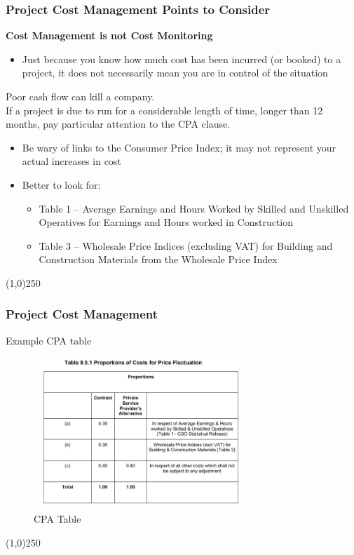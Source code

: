 \begin{frame}
\frametitle{Project Cost Management \hfill Points to Consider}
\textbf{Cost Management is not Cost Monitoring}
\begin{itemize}
	\item Just because you know how much cost has been incurred (or booked) to a project, it does not necessarily mean you are in control of the situation
\end{itemize}
Poor cash flow can kill a company.\\
If a project is due to run for a considerable length of time, longer than 12 months, pay particular attention to the CPA clause.
	\begin{itemize}
		\item Be wary of links to the Consumer Price Index; it may not represent your actual increases in cost
		\item Better to look for:
		\begin{itemize}
			\item Table 1 – Average Earnings and Hours Worked by Skilled and Unskilled Operatives for Earnings and Hours worked in Construction
			\item Table 3 – Wholesale Price Indices (excluding VAT) for Building and Construction Materials from the Wholesale Price Index
		\end{itemize}
	\end{itemize}
\end{frame}
\begin{center}\line(1,0){250}\end{center}







\begin{frame}
\frametitle{Project Cost Management}
Example CPA table
\begin{figure}
	\centering
		\includegraphics[width = 8cm]{images/CPA.jpg}
	\caption{CPA Table}
	\label{fig:CPA}
\end{figure}
\end{frame}
\begin{center}\line(1,0){250}\end{center}






